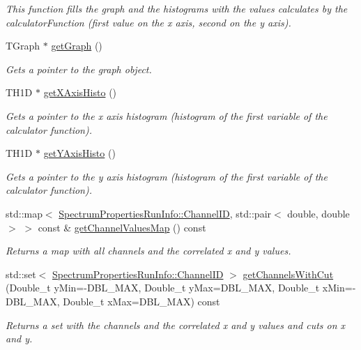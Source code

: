 \begin{DoxyCompactItemize}
\begin{DoxyCompactList}\small\item\em This function fills the graph and the histograms with the values calculates by the calculatorFunction (first value on the x axis, second on the y axis). \item\end{DoxyCompactList}\item 
TGraph $\ast$ \hyperlink{class_run_comparator_a75e708544897139bec4a7b11dc66925b}{getGraph} ()
\begin{DoxyCompactList}\small\item\em Gets a pointer to the graph object. \item\end{DoxyCompactList}\item 
TH1D $\ast$ \hyperlink{class_run_comparator_aa7db01e7789d70087584da1d3e6c281e}{getXAxisHisto} ()
\begin{DoxyCompactList}\small\item\em Gets a pointer to the x axis histogram (histogram of the first variable of the calculator function). \item\end{DoxyCompactList}\item 
TH1D $\ast$ \hyperlink{class_run_comparator_a91ce139df30b4af12e1d64d3421ff570}{getYAxisHisto} ()
\begin{DoxyCompactList}\small\item\em Gets a pointer to the y axis histogram (histogram of the first variable of the calculator function). \item\end{DoxyCompactList}\item 
std::map$<$ \hyperlink{class_spectrum_properties_run_info_1_1_channel_i_d}{SpectrumPropertiesRunInfo::ChannelID}, std::pair$<$ double, double $>$ $>$ const \& \hyperlink{class_run_comparator_a47854c2f02d9632b0c9cd004820fee20}{getChannelValuesMap} () const 
\begin{DoxyCompactList}\small\item\em Returns a map with all channels and the correlated x and y values. \item\end{DoxyCompactList}\item 
std::set$<$ \hyperlink{class_spectrum_properties_run_info_1_1_channel_i_d}{SpectrumPropertiesRunInfo::ChannelID} $>$ \hyperlink{class_run_comparator_a3d58b62450dcc496322872f01774ce68}{getChannelsWithCut} (Double\_\-t yMin=-\/DBL\_\-MAX, Double\_\-t yMax=DBL\_\-MAX, Double\_\-t xMin=-\/DBL\_\-MAX, Double\_\-t xMax=DBL\_\-MAX) const 
\begin{DoxyCompactList}\small\item\em Returns a set with the channels and the correlated x and y values and cuts on x and y. \item\end{DoxyCompactList}\end{DoxyCompactItemize}
